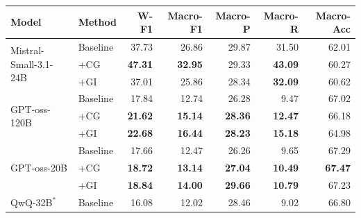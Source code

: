 %
%
%

\begin{table}[t]
\centering
\small
\setlength{\tabcolsep}{5pt}
\renewcommand{\arraystretch}{1.2}
\begin{tabular}{l l rrrrr}
\toprule
\textbf{Model} & \textbf{Method} & \textbf{W-F1} & \textbf{Macro-F1} & \textbf{Macro-P} & \textbf{Macro-R} & \textbf{Macro-Acc} \\
\midrule
\multirow{3}{*}{Mistral-Small-3.1-24B}
  & Baseline &        37.73   &        26.86   &        29.87   &        31.50   &        62.01  \\
  & +CG      & \textbf{47.31} & \textbf{32.95} &        29.33  & \textbf{43.09} &        60.27  \\
  & +GI      &        37.01   &        25.86   &        28.34   & \textbf{32.09} &        60.62  \\[3pt]
\multirow{3}{*}{GPT-oss-120B}
  & Baseline &        17.84   &        12.74   &        26.28   &         9.47   &        67.02  \\
  & +CG      & \textbf{21.62} & \textbf{15.14} & \textbf{28.36} & \textbf{12.47} &        66.18  \\
  & +GI      & \textbf{22.68} & \textbf{16.44} & \textbf{28.23} & \textbf{15.18} &        64.98  \\[3pt]
\multirow{3}{*}{GPT-oss-20B}
  & Baseline &        17.66   &        12.47   &        26.26   &         9.65   &        67.29  \\
  & +CG      & \textbf{18.72} & \textbf{13.14} & \textbf{27.04} & \textbf{10.49} & \textbf{67.47} \\
  & +GI      & \textbf{18.84} & \textbf{14.00} & \textbf{29.66} & \textbf{10.79} &        67.23  \\[3pt]
\multirow{3}{*}{QwQ-32B$^{*}$}
  & Baseline &        16.08   &        12.02   &        28.46   &         9.02   &        66.80  \\

\end{tabular}
\end{table}
